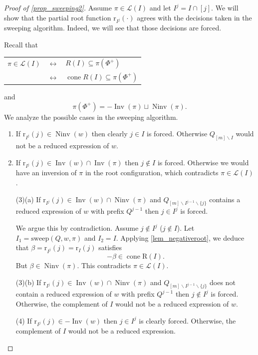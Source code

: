 \documentclass{amsart}
\theoremstyle{definition}
\DeclareMathOperator{\cone}{cone} %
\DeclareMathOperator{\Inv}{Inv} %
\DeclareMathOperator{\Ninv}{Ninv} %
\newcommand{\linearExtensions}{\mathcal{L}} %
\newcommand{\Roots}{\mathrm{R}} %
\newcommand{\rootFunction}[2]{\mathrm{r}_{#1}(#2)} %
\newcommand{\sweepingAlgorithm}{\mathrm{sweep}} %
\begin{document}
\begin{proof}[Proof of \cref{prop_sweeping2}]
Assume $\pi \in \linearExtensions(I)$ and let $I^j=I\cap [j]$.
We will show that the partial root function $\rootFunction{I^j}{\cdot}$ agrees with the decisions taken in the sweeping algorithm.
Indeed, we will see that those decisions are forced.

Recall that 

\begin{center}
\begin{tabular}{ccl}
    $\pi \in \linearExtensions(I)$ & $\longleftrightarrow$ & $R(I)\subseteq \pi(\Phi^+)$\\
     & $\longleftrightarrow$ & $\cone R(I)\subseteq \pi(\Phi^+)$
\end{tabular}    
\end{center}
and 
\[
\pi(\Phi^+) = -\Inv(\pi) \sqcup \Ninv(\pi).
\]
We analyze the possible cases in the sweeping algorithm.

\begin{enumerate}
    \item If $\rootFunction{I^j}{j}\in \Ninv(w)$ then clearly $j\in I$ is forced. Otherwise $Q_{[m]\smallsetminus I}$ would not be a reduced expression of $w$.
    \item If $\rootFunction{I^j}{j}\in \Inv(w) \cap \Inv (\pi)$ then $j\notin I$ is forced. 
    Otherwise we would have an inversion of $\pi$ in the root configuration, which contradicts $\pi \in \linearExtensions(I)$.
    \item[(3)(a)] If $\rootFunction{I^j}{j}\in \Inv(w) \cap \Ninv (\pi)$ and $Q_{[m]\smallsetminus I^{j-1}\smallsetminus \{j\}}$ contains a reduced expression of $w$ with prefix $Q^{j-1}$ then $j\in I^j$ is forced. 

    We argue this by contradiction. 
    Assume $j\notin I^j$ ($j\notin I$). Let $I_1=\sweepingAlgorithm(Q,w,\pi)$ and $I_2=I$. Applying \cref{lem_negativeroot}, we deduce that $\beta=\rootFunction{I^j}{j}=\rootFunction{I}{j}$ satisfies 
    \[
    -\beta \in \cone \Roots(I).
    \]
    But $\beta \in \Ninv(\pi)$. This contradicts $\pi\in \linearExtensions(I)$.
    \item[(3)(b)]  If $\rootFunction{I^j}{j}\in \Inv(w) \cap \Ninv (\pi)$ and $Q_{[m]\smallsetminus I^{j-1}\smallsetminus \{j\}}$ does not contain a reduced expression of $w$ with prefix $Q^{j-1}$ then $j\notin I^j$ is forced. Otherwise, the complement of $I$ would not be a reduced expression of $w$.
    \item[(4)] If $\rootFunction{I^j}{j}\in -\Inv(w)$ then $j\in I^j$ is clearly forced. Otherwise, the complement of $I$ would not be a reduced expression.
\end{enumerate}
\end{proof}
\end{document}
